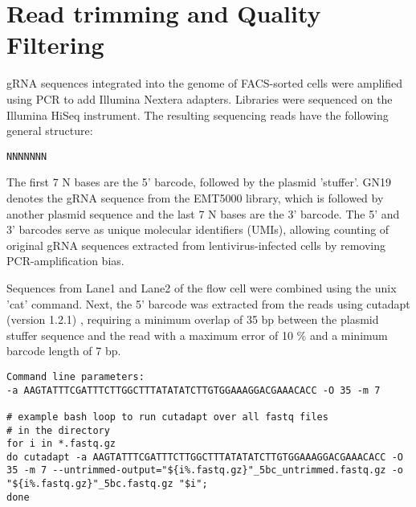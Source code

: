 \section{Read trimming and Quality Filtering}
\label{sec:Bioinformatic analysis of screens with EMT5000 control library and stable cell lines}

   
gRNA sequences integrated into the genome of FACS-sorted cells were amplified using PCR to add Illumina Nextera adapters. Libraries were sequenced on the Illumina HiSeq instrument. The resulting sequencing reads have the following general structure:

\texttt{{\color{my-green}NNNNNNN}}

The first 7 N bases are the {\color{my-green}5' barcode}, followed by the plasmid 'stuffer'.  GN19 denotes the {\color{my-orange}gRNA sequence} from the EMT5000 library, which is followed by another plasmid sequence and the last 7 N bases are the {\color{my-blue}3' barcode}. The 5' and 3' barcodes serve as unique molecular identifiers (UMIs), allowing counting of original gRNA sequences extracted from lentivirus-infected cells by removing PCR-amplification bias.

Sequences from Lane1 and Lane2 of the flow cell were combined using the unix 'cat' command. Next, the 5' barcode was extracted from the reads using cutadapt (version 1.2.1) \cite{Martin:2011va}, requiring a minimum overlap of 35 bp between the plasmid stuffer sequence and the read with a maximum error of 10 \% and a minimum barcode length of 7 bp.

\begin{small}\begin{lstlisting}
Command line parameters:
-a AAGTATTTCGATTTCTTGGCTTTATATATCTTGTGGAAAGGACGAAACACC -O 35 -m 7 

# example bash loop to run cutadapt over all fastq files 
# in the directory
for i in *.fastq.gz
do cutadapt -a AAGTATTTCGATTTCTTGGCTTTATATATCTTGTGGAAAGGACGAAACACC -O 35 -m 7 --untrimmed-output="${i%.fastq.gz}"_5bc_untrimmed.fastq.gz -o "${i%.fastq.gz}"_5bc.fastq.gz "$i";
done
\end{lstlisting}\end{small}

